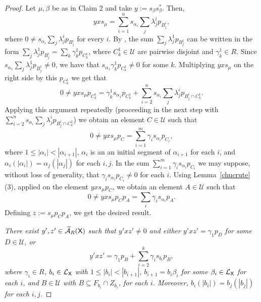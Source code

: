 \documentclass[a4paper,12pt]{amsart}
\theoremstyle{definition}
\theoremstyle{remark}
\numberwithin{equation}{section}
\newcommand{\osf}{{\normalfont \textsf{X}}}
\newcommand{\lang}{\CL_{\osf}}
\newcommand{\ualgshift}{\TCA_R(\osf)}
\newcommand{\CA}{\mathcal{A}}
\newcommand{\CL}{\mathcal{L}}
\newcommand{\TCA}{\widetilde{\CA}}
\newcommand{\TCB}{\mathcal{U}}
\begin{document}
\begin{proof}
Let $\mu, \beta$ be as in Claim 2 and take $y:=s_\beta s_\beta^*$. Then,
$$yxs_\mu=\sum\limits_{i=1}^n s_{\alpha_i}\sum\limits_j \lambda_j^ip_{B_j^i},$$  where $0\neq s_{\alpha_i} \sum\limits_j \lambda_j^ip_{B_j^i}$ for every $i$. 
By \cite[Lemma 3.5]{BCGW21}, the sum $\sum \limits_j \lambda_j^1p_{B_j^1}$ can be written in the form $\sum \limits_j \lambda_j^1p_{B_j^i}=\sum\limits_k {\gamma_k^1}p_{C_k^1}$, where $C_k^1 \in \TCB$ are pairwise disjoint and $\gamma_k^1\in R$.
Since $s_{\alpha_1}\sum\limits_j \lambda_j^1p_{B_j^1}\neq 0$, we have that $s_{\alpha_1}\gamma_k^1p_{C_k^1}\neq 0$ for some $k$. Multiplying $yxs_\mu$ on the right side by this $p_{C_k^1}$ we get that 
$$0\neq yxs_\mu p_{C_k^1}=\gamma_k^1s_{\alpha_1}p_{C_k^1}+\sum\limits_{i=2}^n s_{\alpha_i}\sum\limits_j \lambda_j^ip_{B_j^i\cap C_k^1}.$$
Applying this argument repeatedly (proceeding in the next step with $\sum\limits_{i=2}^n s_{\alpha_i}\sum\limits_j \lambda_j^ip_{B_j^i\cap C_k^1}$) we obtain an element $C\in \TCB$ such that 
$$0\neq y xs_\mu p_C=\sum\limits_{i=1}^m\gamma_is_{\alpha_i}p_{C_i},$$ where $1\leq |\alpha_i|<|\alpha_{i+1}|$, $\alpha_i$ is an an initial segment of $\alpha_{i+1}$ for each $i$, and $\alpha_i(|\alpha_i|)=\alpha_j(|\alpha_j|)$ for each $i,j$. In the sum $\sum\limits_{i=1}^m\gamma_is_{\alpha_i}p_{C_i}$ we may suppose, without loss of generality, that $\gamma_is_{\alpha_i}p_{C_i}\neq 0$ for each $i$.
Using Lemma~\ref{chucrute}(3), applied on the element $y x s_\mu p_C$, we obtain an element $A\in \TCB$ such that $$0\neq yxs_\mu p_Cp_A=\sum\limits_{i}\gamma_i s_{\alpha_i}p_A.$$ Defining $z:=s_\mu p_C p_A$, we get the desired result.

\smallskip
{} {\it There exist $y',z'\in \ualgshift$ such that $y'xz'\neq 0$ and either $y'xz'=\gamma_1p_D$ for some $D\in \TCB$, or 
$$y'xz'=\gamma_1 p_B+\sum\limits_{i=2}^k\gamma_i s_{b_i} p_B,$$ where $\gamma_i \in R$, $b_i\in \lang$ with $1\leq |b_i|<|b_{i+1}|$, $b_{i+1}=b_i\beta_i$ for some $\beta_i \in \lang$ for each $i$, and $B\in \TCB$ with $B\subseteq F_{b_i}\cap Z_{b_i}$, for each $i$. Moreover, $b_i(|b_i|)=b_j(|b_j|)$ for each $i, j$.}
\smallskip


\end{proof}
\end{document}
